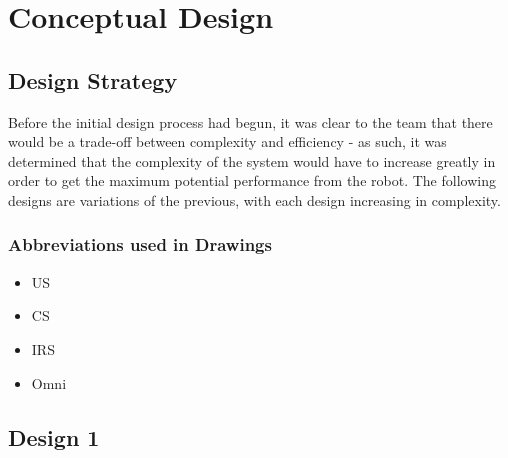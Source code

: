 \documentclass[11pt]{report}
\begin{document}
\chapter{Conceptual Design}\label{ch:conceptual-design}

\section*{Design Strategy}
Before the initial design process had begun, it was clear to the team that there would be a trade-off between complexity and efficiency - as such, it was determined that the complexity of the system would have to increase greatly in order to get the maximum potential performance from the robot. The following designs are variations of the previous, with each design increasing in complexity.

\subsection*{Abbreviations used in Drawings}
\begin{itemize}
    \item \gls{US}
    \item \gls{CS}
    \item \gls{IRS}
    \item \gls{Omni}
\end{itemize}

\section{Design 1}
\end{document}
